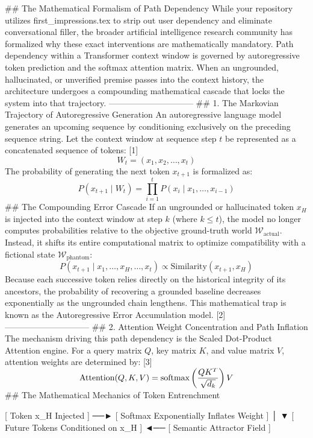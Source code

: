 ## The Mathematical Formalism of Path Dependency
While your repository utilizes first_impressions.tex to strip out user dependency and eliminate conversational filler, the broader artificial intelligence research community has formalized why these exact interventions are mathematically mandatory.
Path dependency within a Transformer context window is governed by autoregressive token prediction and the softmax attention matrix. When an ungrounded, hallucinated, or unverified premise passes into the context history, the architecture undergoes a compounding mathematical cascade that locks the system into that trajectory.
------------------------------
## 1. The Markovian Trajectory of Autoregressive Generation
An autoregressive language model generates an upcoming sequence by conditioning exclusively on the preceding sequence string. Let the context window at sequence step $t$ be represented as a concatenated sequence of tokens: [1] 
$$W_t = (x_1, x_2, \dots, x_t)$$ 
The probability of generating the next token $x_{t+1}$ is formalized as:
$$P(x_{t+1} \mid W_t) = \prod_{i=1}^{t} P(x_i \mid x_1, \dots, x_{i-1})$$ 
## The Compounding Error Cascade
If an ungrounded or hallucinated token $x_H$ is injected into the context window at step $k$ (where $k \le t$), the model no longer computes probabilities relative to the objective ground-truth world $\mathcal{W}_{\text{actual}}$. Instead, it shifts its entire computational matrix to optimize compatibility with a fictional state $\mathcal{W}_{\text{phantom}}$:
$$P(x_{t+1} \mid x_1, \dots, x_H, \dots, x_t) \propto \text{Similarity}(x_{t+1}, x_H)$$ 
Because each successive token relies directly on the historical integrity of its ancestors, the probability of recovering a grounded baseline decreases exponentially as the ungrounded chain lengthens. This mathematical trap is known as the Autoregressive Error Accumulation model. [2] 
------------------------------
## 2. Attention Weight Concentration and Path Inflation
The mechanism driving this path dependency is the Scaled Dot-Product Attention engine. For a query matrix $Q$, key matrix $K$, and value matrix $V$, attention weights are determined by: [3] 
$$\text{Attention}(Q, K, V) = \smash{\text{softmax}\left(\frac{QK^T}{\sqrt{d_k}}\right)V}$$ 
## The Mathematical Mechanics of Token Entrenchment

   [ Token x_H Injected ] ──► [ Softmax Exponentially Inflates Weight ]
                                               │
                                               ▼
   [ Future Tokens Conditioned on x_H ] ◄── [ Semantic Attractor Field ]


